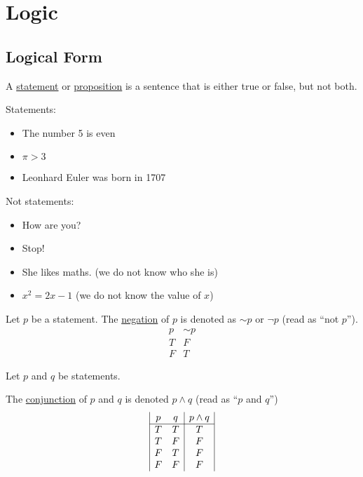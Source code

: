 \section{Logic}
\subsection{Logical Form}
\begin{definition}A \underline{statement} or \underline{proposition} is a sentence that is either true or false, but not both.\end{definition}

\begin{example}
Statements: \begin{itemize}
    \item The number 5 is even
    \item $\pi > 3$
    \item Leonhard Euler was born in 1707
\end{itemize}

Not statements: \begin{itemize}
    \item How are you?
    \item Stop!
    \item She likes maths. (we do not know who she is)
    \item $x^2 = 2x - 1$ (we do not know the value of $x$)
\end{itemize}
\end{example}

\begin{definition}Let $p$ be a statement. The \underline{negation} of $p$ is denoted as $\sim p$ or $\neg p$ (read as ``not $p$'').$$\begin{array}{|c|c|}
p & \sim p \\
\hline
T & F \\
F & T
\end{array}$$
\end{definition}


Let $p$ and $q$ be statements.

\begin{definition}The \underline{conjunction} of $p$ and $q$ is denoted $p \land q$ (read as ``$p$ and $q$'')$$\begin{array}{|c c|c|}
p & q & p\land q \\
\hline
T & T & T \\
T & F & F \\
F & T & F \\
F & F & F
\end{array}$$\end{definition}



